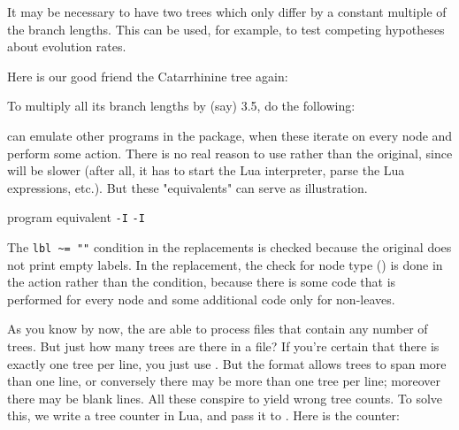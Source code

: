 \page[no]


\page[no]

It may be necessary to have two trees which only differ by a constant multiple
of the branch lengths. This can be used, for example, to test competing
hypotheses about evolution rates.

Here is our good friend the Catarrhinine tree again:

\startalignment[center]
\externalfigure[ed_8_svg]
\stopalignment

To multiply all its branch lengths by (say) 3.5, do the following:

\startalignment[center]
\externalfigure[ed_12_svg]
\stopalignment


\luaed{} can emulate other programs in the package, when these
iterate on every node and perform some action. There is no real reason to use
\luaed{} rather than the original, since \luaed{} will be slower (after all, it
has to start the Lua interpreter, parse the Lua expressions, etc.). But these
"equivalents" can serve as illustration.

\startalignment[center]
\starttabulate[|l|l|]
program \NC \luaed{} equivalent \NC\NR
\HL
{} 						  \NC\NR
{} {\tt -I} 		 \NC\NR
\topology{}						 \NC\NR
\topology{} {\tt -I} 	
\stoptabulate
\stopalignment

The {\tt lbl \~{}= ""} condition in the  replacements is checked
because the original  does not print empty labels. In the \topology{}
replacement, the check for node type () is done in the action rather
than the condition, because there is some code that is performed for every node
and some additional code only for non-leaves. 


As you know by now, the \nutils{} are able to process files that contain any
number of trees. But just how many trees are there in a file? If you're certain
that there is exactly one tree per line, you just use . But the
\nw{} format allows trees to span more than one line, or conversely there may be
more than one tree per line; moreover there may be blank lines. All these
conspire to yield wrong tree counts. To solve this, we write a tree counter in
Lua, and pass it to \luaed. Here is the counter:

